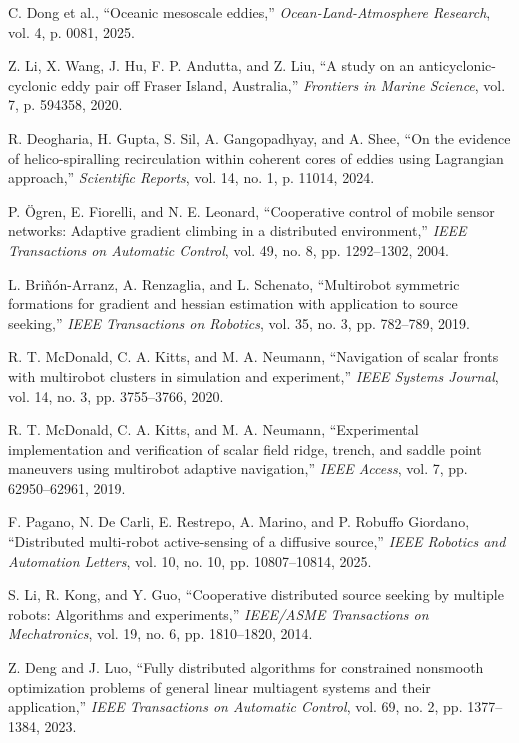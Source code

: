  C. Dong et al., ``Oceanic mesoscale eddies,'' \textit{Ocean-Land-Atmosphere Research}, vol. 4, p. 0081, 2025.

 Z. Li, X. Wang, J. Hu, F. P. Andutta, and Z. Liu, ``A study on an anticyclonic-cyclonic eddy pair off Fraser Island, Australia,'' \textit{Frontiers in Marine Science}, vol. 7, p. 594358, 2020.

 R. Deogharia, H. Gupta, S. Sil, A. Gangopadhyay, and A. Shee, ``On the evidence of helico-spiralling recirculation within coherent cores of eddies using Lagrangian approach,'' \textit{Scientific Reports}, vol. 14, no. 1, p. 11014, 2024.

 P. Ögren, E. Fiorelli, and N. E. Leonard, ``Cooperative control of mobile sensor networks: Adaptive gradient climbing in a distributed environment,'' \textit{IEEE Transactions on Automatic Control}, vol. 49, no. 8, pp. 1292--1302, 2004.

 L. Briñón-Arranz, A. Renzaglia, and L. Schenato, ``Multirobot symmetric formations for gradient and hessian estimation with application to source seeking,'' \textit{IEEE Transactions on Robotics}, vol. 35, no. 3, pp. 782--789, 2019.

 R. T. McDonald, C. A. Kitts, and M. A. Neumann, ``Navigation of scalar fronts with multirobot clusters in simulation and experiment,'' \textit{IEEE Systems Journal}, vol. 14, no. 3, pp. 3755--3766, 2020.

 R. T. McDonald, C. A. Kitts, and M. A. Neumann, ``Experimental implementation and verification of scalar field ridge, trench, and saddle point maneuvers using multirobot adaptive navigation,'' \textit{IEEE Access}, vol. 7, pp. 62950--62961, 2019.

 F. Pagano, N. De Carli, E. Restrepo, A. Marino, and P. Robuffo Giordano, ``Distributed multi-robot active-sensing of a diffusive source,'' \textit{IEEE Robotics and Automation Letters}, vol. 10, no. 10, pp. 10807--10814, 2025.

 S. Li, R. Kong, and Y. Guo, ``Cooperative distributed source seeking by multiple robots: Algorithms and experiments,'' \textit{IEEE/ASME Transactions on Mechatronics}, vol. 19, no. 6, pp. 1810--1820, 2014.

 Z. Deng and J. Luo, ``Fully distributed algorithms for constrained nonsmooth optimization problems of general linear multiagent systems and their application,'' \textit{IEEE Transactions on Automatic Control}, vol. 69, no. 2, pp. 1377--1384, 2023.

